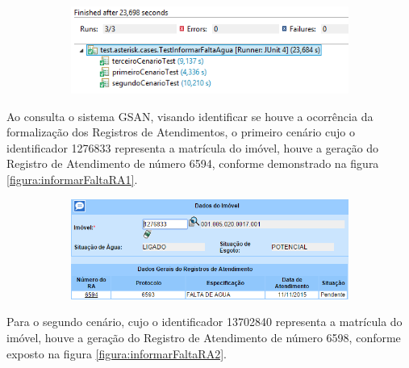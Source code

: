 	\begin{figure}[H]
		\centering
		\caption{Informar Falta de Água - Detalhes execução dos testes}
		\label{figura:informarFaltaJUnit}
		\begin{subfigure}[H]{\textwidth}
			\centering
			\includegraphics{figuras/cenarios/informar_falta_agua/junit_result.PNG}
		\end{subfigure}
	\end{figure}

Ao consulta o sistema GSAN, visando identificar se houve a ocorrência da formalização dos Registros de Atendimentos, o primeiro cenário cujo o identificador 1276833 representa a matrícula do imóvel, houve a geração do Registro de Atendimento de número 6594, conforme demonstrado na figura \ref{figura:informarFaltaRA1}.

\begin{figure}[H]
	\centering
		\caption{Informar Falta de Água - RA gerado para o Cenário 1}
		\label{figura:informarFaltaRA1}
	\begin{subfigure}[H]{\textwidth}
		\centering
		\includegraphics{figuras/cenarios/informar_falta_agua/resultado_1.PNG}
	\end{subfigure}
\end{figure}

	
Para o segundo cenário, cujo o identificador 13702840 representa a matrícula do imóvel, houve a geração do Registro de Atendimento de número 6598, conforme exposto na figura \ref{figura:informarFaltaRA2}.	
		
